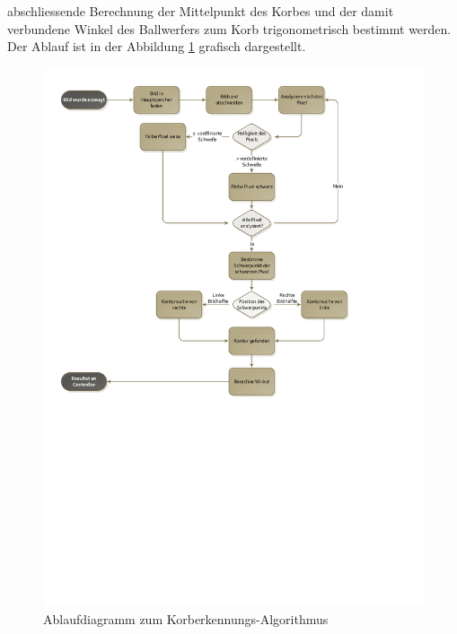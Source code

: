 		abschliessende Berechnung der Mittelpunkt des Korbes und der damit 
		verbundene Winkel des Ballwerfers zum Korb trigonometrisch bestimmt werden.
		Der Ablauf ist in der Abbildung \ref{fig:KorberkennungFlowchart} grafisch 
		dargestellt.
		\begin{figure}[h!]
			\centering
			\includegraphics[width=1\textwidth,clip,trim=9mm 115mm 41mm 9mm]
			{Enddokumentation/Loesungskonzept/Bilder/Flowchart_Korberkennung.pdf}
			\caption{Ablaufdiagramm zum Korberkennungs-Algorithmus}
			\label{fig:KorberkennungFlowchart}
		\end{figure}